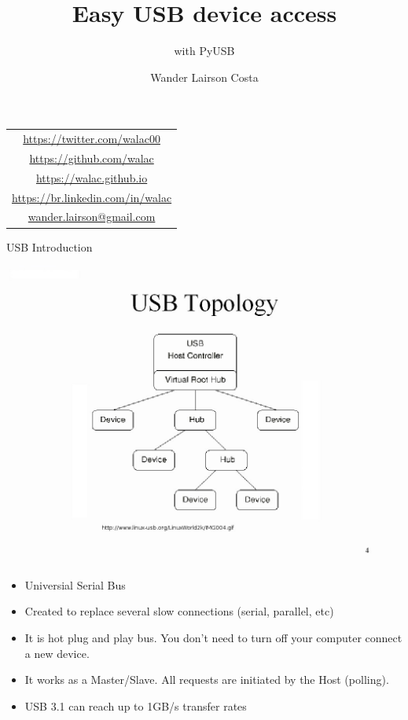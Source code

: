 \documentclass[pdf]{beamer}
\title[PyUSB]{Easy USB device access}
\subtitle{with PyUSB}
\author{{\Large Wander Lairson Costa}}
\institute{{\large Mozilla Corporation}}
\date{}
\begin{document}
\begin{frame}
  \transdissolve
  \titlepage
  \begin{center}
    \begin{tabular}{c}
      \url{https://twitter.com/walac00} \\
      \url{https://github.com/walac} \\
      \url{https://walac.github.io} \\
      \url{https://br.linkedin.com/in/walac} \\
      \href{mailto:wander.lairson@gmail.com}{wander.lairson@gmail.com} \\
    \end{tabular}
  \end{center}
\end{frame}

\begin{frame}{USB Introduction}
  \transdissolve
  \begin{center}
    \includegraphics[scale=0.15]{img/topology.jpg}
  \end{center}
  \begin{itemize}
    \tiny
    \item Universial Serial Bus
    \item Created to replace several slow connections (serial, parallel, etc)
    \item It is hot plug and play bus. You don't need to turn off your computer
        connect a new device.
    \item It works as a Master/Slave. All requests are initiated by the Host (polling).
    \item USB 3.1 can reach up to 1GB/s transfer rates
  \end{itemize}
\end{frame}
\end{document}
